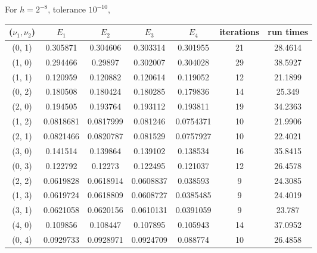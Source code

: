 \documentclass[12pt]{article}
\begin{document}
For $h=2^{-8}$, tolerance $10^{-10}$,
\begin{center}
\begin{tabular}{||c|cccc|c|c||}
\hline \hline
 ($\nu_1, \nu_2$)   & $E_1$ & $E_2$ &  $E_3$ & $E_4$ &   iterations & run times\\
\hline \hline
 (0, 1)   &  0.305871  &      0.304606  &      0.303314  &      0.301955  &           21 &     28.4614 \\
 (1, 0)   &  0.294466  &      0.29897   &      0.302007  &      0.304028  &           29 &     38.5927 \\ \hline
 \color{red}(1, 1)   &  0.120959  &      0.120882  &      0.120614  &      0.119052  &           12 &     \color{red}21.1899 \\
 (0, 2)   &  0.180508  &      0.180424  &      0.180285  &      0.179836  &           14 &     25.349  \\
 (2, 0)   &  0.194505  &      0.193764  &      0.193112  &      0.193811  &           19 &     34.2363 \\ \hline
 (1, 2)   &  0.0818681 &      0.0817999 &      0.081246  &      0.0754371 &           10 &     21.9906 \\
 (2, 1)   &  0.0821466 &      0.0820787 &      0.081529  &      0.0757927 &           10 &     22.4021 \\
 (3, 0)   &  0.141514  &      0.139864  &      0.139102  &      0.138534  &           16 &     35.8415 \\
 (0, 3)   &  0.122792  &      0.12273   &      0.122495  &      0.121037  &           12 &     26.4578 \\ \hline
 (2, 2)   &  0.0619828 &      0.0618914 &      0.0608837 &      0.038593  &            9 &     24.3085 \\
 (1, 3)   &  0.0619724 &      0.0618809 &      0.0608727 &      0.0385485 &            9 &     24.4019 \\
 (3, 1)   &  0.0621058 &      0.0620156 &      0.0610131 &      0.0391059 &            9 &     23.787  \\
 (4, 0)   &  0.109856  &      0.108447  &      0.107895  &      0.105943  &           14 &     37.0952 \\
 (0, 4)   &  0.0929733 &      0.0928971 &      0.0924709 &      0.088774  &           10 &     26.4858 \\
\hline \hline
\end{tabular}
\end{center}
\end{document}
